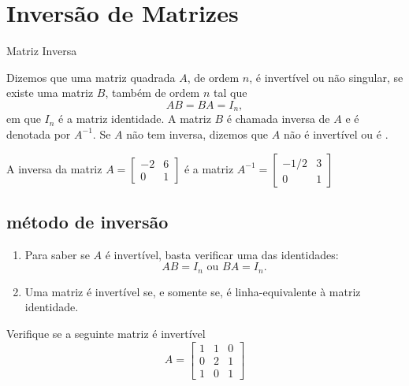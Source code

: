 \section{Inversão de Matrizes}

\begin{frame}[label=inversao]{Matriz Inversa}

\begin{defin}
Dizemos que uma matriz quadrada $A$, de ordem $n$, é {\color{blue} invertível} ou {\color{blue} não singular}, se existe uma matriz $B$, também de ordem $n$ tal que
\[AB=BA=I_n,\]
em que $I_n$ é a matriz identidade. A matriz $B$ é chamada {\color{blue}inversa de $A$} e é denotada por $A^{-1}$. Se $A$ não tem inversa, dizemos que $A$ {\color{blue} não é invertível} ou é {\color{blue}{singular}}.
\end{defin}

\begin{exe}
A inversa da matriz 
$A=\begin{bmatrix}
-2 & 6\\ 0 & 1
\end{bmatrix}$ é a matriz $A^{-1}=\begin{bmatrix}
 -1/2 & 3\\ 0 & 1
\end{bmatrix}$
\end{exe}
\end{frame}

\subsection*{método de inversão}
\begin{frame}[label=inversao]

\begin{prop}
\begin{enumerate}
\item Para saber se $A$ é invertível, basta verificar uma das identidades:
\[AB=I_n \text{ ou } BA=I_n.\]

\item Uma matriz é invertível se, e somente se, é linha-equivalente à matriz identidade.

\end{enumerate}
\end{prop}

\begin{exe}
Verifique se a seguinte matriz é invertível
\[
A=\begin{bmatrix}
1 & 1 & 0\\ 0 & 2 & 1 \\ 1& 0 & 1
\end{bmatrix}
\] 
\end{exe}

\end{frame}


